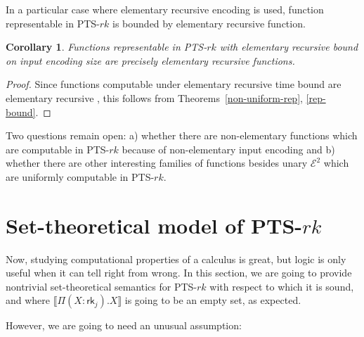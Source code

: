 \documentclass{article}
\newtheorem{corollary}{Corollary}
\theoremstyle{definition}
\theoremstyle{remark}
\begin{document}
In a particular case where elementary recursive
encoding is used, function representable in PTS-$rk$ is
bounded by elementary recursive function.

\begin{corollary}
    Functions representable in PTS-$rk$ with elementary
    recursive bound on input encoding size are
    precisely elementary recursive functions.
\end{corollary}
\begin{proof}
    Since functions computable under elementary
    recursive time bound are elementary recursive
    \cite{CookKapron2017PrimitiveRecursive}, this
    follows from Theorems~\ref{non-uniform-rep},
    \ref{rep-bound}.
\end{proof}

Two questions remain open: a) whether there are
non-elementary functions which are computable in
PTS-$rk$ because of non-elementary input encoding and
b) whether there are other interesting families of
functions besides unary $\mathcal{E}^2$ which are
uniformly computable in PTS-$rk$.

\section{Set-theoretical model of
PTS-\texorpdfstring{$rk$}{rk}}
\label{rk-model}

Now, studying computational properties of a calculus is
great, but logic is only useful when it can tell right
from wrong. In this section, we are going to provide
nontrivial set-theoretical semantics for PTS-$rk$ with
respect to which it is sound, and where
$\llbracket\Pi(X:\mathsf{rk}_j).X\rrbracket$ is going
to be an empty set, as expected.

However, we are going to need an unusual assumption:
\end{document}

